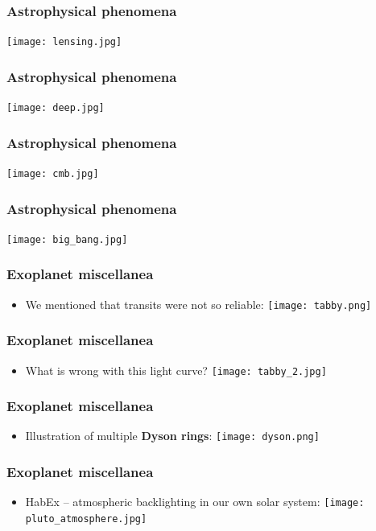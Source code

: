 \documentclass{beamer}
\begin{document}
\begin{frame}
  \center
  \frametitle{Astrophysical phenomena}
  \texttt{[image: lensing.jpg]}
\end{frame}

\begin{frame}
  \center
  \frametitle{Astrophysical phenomena}
  \texttt{[image: deep.jpg]}
\end{frame}

\begin{frame}
  \center
  \frametitle{Astrophysical phenomena}
  \texttt{[image: cmb.jpg]}
\end{frame}

\begin{frame}
  \center
  \frametitle{Astrophysical phenomena}
  \texttt{[image: big\_bang.jpg]}
\end{frame}

\begin{frame}
  \frametitle{Exoplanet miscellanea}
  \begin{itemize}
    \item We mentioned that transits were not so reliable:
      \texttt{[image: tabby.png]}
  \end{itemize}
\end{frame}

\begin{frame}
  \frametitle{Exoplanet miscellanea}
  \begin{itemize}
    \item What is wrong with this light curve?
      \texttt{[image: tabby\_2.jpg]}
  \end{itemize}
\end{frame}

\begin{frame}
  \frametitle{Exoplanet miscellanea}
  \begin{itemize}
    \item Illustration of multiple \textbf{Dyson rings}:
      \texttt{[image: dyson.png]}
  \end{itemize}
\end{frame}

\begin{frame}
  \frametitle{Exoplanet miscellanea}
  \begin{itemize}
    \item HabEx -- atmospheric backlighting in our own solar system:
      \texttt{[image: pluto\_atmosphere.jpg]}
  \end{itemize}
\end{frame}
\end{document}
